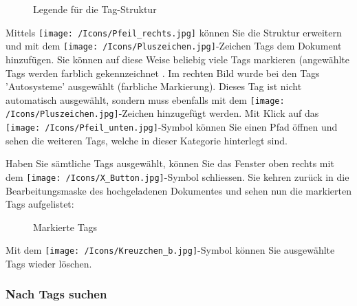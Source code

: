 \begin{figure}[H]
\caption{Legende für die Tag-Struktur}
\end{figure}

Mittels \texttt{[image: /Icons/Pfeil\_rechts.jpg]} können Sie die Struktur erweitern und mit dem \texttt{[image: /Icons/Pluszeichen.jpg]}-Zeichen  Tags dem Dokument hinzufügen. Sie können auf diese Weise beliebig viele Tags markieren (angewählte Tags werden farblich gekennzeichnet . Im rechten Bild wurde bei den Tags 'Autosysteme' ausgewählt  (farbliche Markierung). Dieses Tag ist nicht automatisch ausgewählt, sondern muss ebenfalls mit dem \texttt{[image: /Icons/Pluszeichen.jpg]}-Zeichen hinzugefügt werden. Mit Klick auf das \texttt{[image: /Icons/Pfeil\_unten.jpg]}-Symbol können Sie einen Pfad öffnen und sehen die weiteren Tags, welche in dieser Kategorie hinterlegt sind.  \newline

Haben Sie sämtliche Tags ausgewählt, können Sie das Fenster oben rechts mit dem \texttt{[image: /Icons/X\_Button.jpg]}-Symbol  schliessen. Sie kehren zurück in die Bearbeitungsmaske des hochgeladenen Dokumentes und sehen nun die markierten Tags aufgelistet:

\begin{figure}[H]
\caption{Markierte Tags}
\end{figure}

Mit dem \texttt{[image: /Icons/Kreuzchen\_b.jpg]}-Symbol  können Sie ausgewählte Tags wieder löschen.
 
\subsubsection{Nach Tags suchen}
\label{bkm:Ref442275849}

